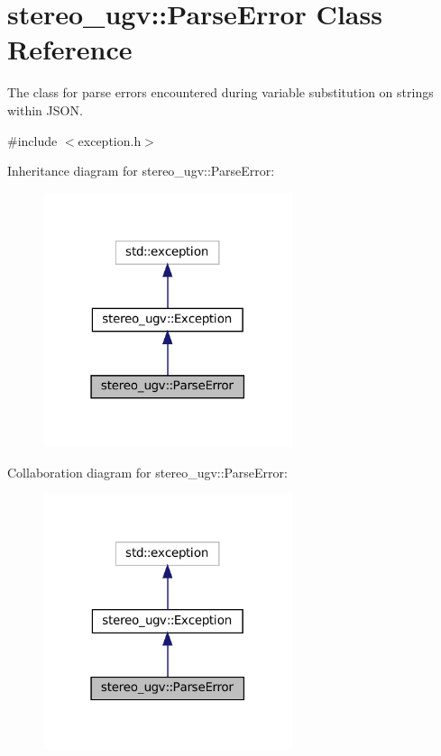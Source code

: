 \hypertarget{classstereo__ugv_1_1ParseError}{}\section{stereo\+\_\+ugv\+:\+:Parse\+Error Class Reference}
\label{classstereo__ugv_1_1ParseError}


The class for parse errors encountered during variable substitution on strings within J\+S\+ON.  




{\ttfamily \#include $<$exception.\+h$>$}



Inheritance diagram for stereo\+\_\+ugv\+:\+:Parse\+Error\+:
\nopagebreak
\begin{figure}[H]
\begin{center}
\leavevmode
\includegraphics[width=207pt]{classstereo__ugv_1_1ParseError__inherit__graph}
\end{center}
\end{figure}


Collaboration diagram for stereo\+\_\+ugv\+:\+:Parse\+Error\+:
\nopagebreak
\begin{figure}[H]
\begin{center}
\leavevmode
\includegraphics[width=207pt]{classstereo__ugv_1_1ParseError__coll__graph}
\end{center}
\end{figure}
